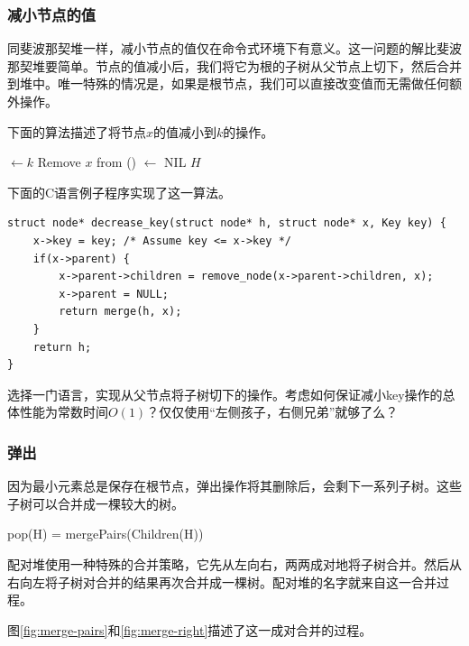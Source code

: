 \documentclass[b5paper]{ctexart}
\begin{document}
\subsubsection{减小节点的值}

同斐波那契堆一样，减小节点的值仅在命令式环境下有意义。这一问题的解比斐波那契堆要简单。节点的值减小后，我们将它为根的子树从父节点上切下，然后合并到堆中。唯一特殊的情况是，如果是根节点，我们可以直接改变值而无需做任何额外操作。

下面的算法描述了将节点$x$的值减小到$k$的操作。

\begin{algorithmic}[1]
  \State {} $\gets k$
    \State Remove $x$ from ()
     $\gets$ NIL
    \State \Return {}
  \EndIf
  \State \Return $H$
\EndFunction
\end{algorithmic}

下面的C语言例子程序实现了这一算法。

\lstset{language=C}
\begin{lstlisting}
struct node* decrease_key(struct node* h, struct node* x, Key key) {
    x->key = key; /* Assume key <= x->key */
    if(x->parent) {
        x->parent->children = remove_node(x->parent->children, x);
        x->parent = NULL;
        return merge(h, x);
    }
    return h;
}
\end{lstlisting}

\begin{Exercise}
选择一门语言，实现从父节点将子树切下的操作。考虑如何保证减小key操作的总体性能为常数时间$O(1)$？仅仅使用“左侧孩子，右侧兄弟”就够了么？
\end{Exercise}

\subsubsection{弹出}
 

因为最小元素总是保存在根节点，弹出操作将其删除后，会剩下一系列子树。这些子树可以合并成一棵较大的树。

\be
  pop(H) = mergePairs(Children(H))
\ee

配对堆使用一种特殊的合并策略，它先从左向右，两两成对地将子树合并。然后从右向左将子树对合并的结果再次合并成一棵树。配对堆的名字就来自这一合并过程。

图\ref{fig:merge-pairs}和\ref{fig:merge-right}描述了这一成对合并的过程。
\end{document}
